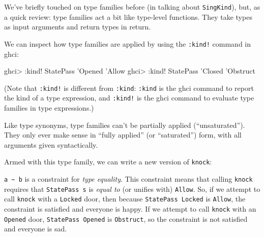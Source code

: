 \documentclass[]{article}
\newenvironment{Shaded}{}{}
\newcommand{\CommentTok}[1]{\textcolor[rgb]{0.38,0.63,0.69}{\textit{#1}}}
\newcommand{\DataTypeTok}[1]{\textcolor[rgb]{0.56,0.13,0.00}{#1}}
\newcommand{\FunctionTok}[1]{\textcolor[rgb]{0.02,0.16,0.49}{#1}}
\newcommand{\NormalTok}[1]{#1}
\newcommand{\OtherTok}[1]{\textcolor[rgb]{0.00,0.44,0.13}{#1}}
\newcommand{\StringTok}[1]{\textcolor[rgb]{0.25,0.44,0.63}{#1}}
\begin{document}
We've briefly touched on type families before (in talking about
\texttt{SingKind}), but, as a quick review: type families act a bit like
type-level functions. They take types as input arguments and return types in
return.

We can inspect how type families are applied by using the \texttt{:kind!}
command in ghci:

\begin{Shaded}
\begin{Highlighting}[]
\NormalTok{ghci}\FunctionTok{>} \FunctionTok{:}\NormalTok{kind}\FunctionTok{!} \DataTypeTok{StatePass}\NormalTok{ '}\DataTypeTok{Opened}
\NormalTok{'}\DataTypeTok{Allow}
\NormalTok{ghci}\FunctionTok{>} \FunctionTok{:}\NormalTok{kind}\FunctionTok{!} \DataTypeTok{StatePass}\NormalTok{ '}\DataTypeTok{Closed}
\NormalTok{'}\DataTypeTok{Obstruct}
\end{Highlighting}
\end{Shaded}

(Note that \texttt{:kind!} is different from \texttt{:kind}: \texttt{:kind} is
the ghci command to report the kind of a type expression, and \texttt{:kind!} is
the ghci command to evaluate type families in type expressions.)

Like type synonyms, type families can't be partially applied (``unsaturated'').
They only ever make sense in ``fully applied'' (or ``saturated'') form, with all
arguments given syntactically.

Armed with this type family, we can write a new version of \texttt{knock}:

\begin{Shaded}
\end{Shaded}

\texttt{a\ \textasciitilde{}\ b} is a constraint for \emph{type equality}. This
constraint means that calling \texttt{knock} requires that \texttt{StatePass\ s}
is \emph{equal to} (or unifies with) \texttt{\textquotesingle{}Allow}. So, if we
attempt to call \texttt{knock} with a \texttt{\textquotesingle{}Locked} door,
then because \texttt{StatePass\ \textquotesingle{}Locked} is
\texttt{\textquotesingle{}Allow}, the constraint is satisfied and everyone is
happy. If we attempt to call \texttt{knock} with an
\texttt{\textquotesingle{}Opened} door,
\texttt{StatePass\ \textquotesingle{}Opened} is
\texttt{\textquotesingle{}Obstruct}, so the constraint is not satisfied and
everyone is sad.
\end{document}
